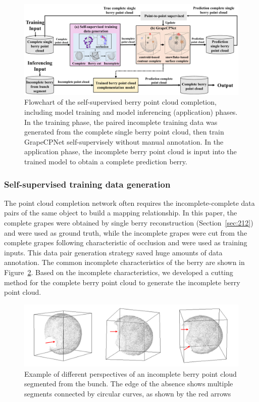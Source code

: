 \documentclass[12pt]{article}
\begin{document}
\begin{figure}[hbt!]
    \centering
    \includegraphics[width=1\textwidth]{figures/Figure7.pdf}
    \caption{Flowchart of the self-supervised berry point cloud completion, including model training and model inferencing (application) phases. In the training phase, the paired incomplete training data was generated from the complete single berry point cloud, then train GrapeCPNet self-supervisely without manual annotation. In the application phase, the incomplete berry point cloud is input into the trained model to obtain a complete prediction berry.}
    \label{fig:raw3}
\end{figure}

\subsubsection{Self-supervised training data generation}

The point cloud completion network often requires the incomplete-complete data pairs of the same object to build a mapping relationship. 
In this paper, the complete grapes were obtained by single berry reconstruction (Section~\ref{sec:212}) and were used as ground truth, while the incomplete grapes were cut from the complete grapes following characteristic of occlusion and were used as training inputs. 
This data pair generation strategy saved huge amounts of data annotation. The common incomplete characteristics of the berry are shown in Figure~\ref{fig:raw4}.
Based on the incomplete characteristics, we developed a cutting method for the complete berry point cloud to generate the incomplete berry point cloud.

\begin{figure}[hbt!]
    \centering
    \includegraphics[width=1\textwidth]{figures/Figure8.pdf}
    \caption{Example of different perspectives of an incomplete berry point cloud segmented from the bunch. The edge of the absence shows multiple segments connected by circular curves, as shown by the red arrows}
    \label{fig:raw4}
\end{figure}
\end{document}
